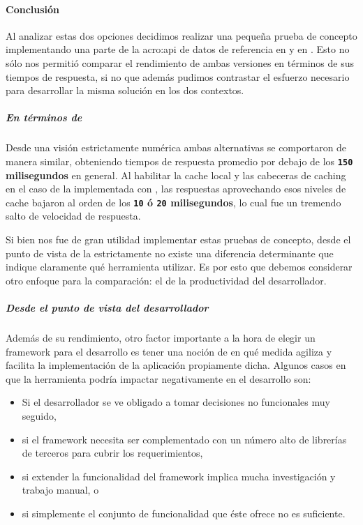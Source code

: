 \paragraph{Conclusión}

Al analizar estas dos opciones decidimos realizar una pequeña prueba de concepto implementando una parte de la \gls{acro:api} de datos de referencia en  y en . Esto no sólo nos permitió comparar el rendimiento de ambas versiones en términos de sus tiempos de respuesta, si no que además pudimos contrastar el esfuerzo necesario para desarrollar la misma solución en los dos contextos.

\subparagraph{En términos de }

Desde una visión estrictamente numérica ambas alternativas se comportaron de manera similar, obteniendo tiempos de respuesta promedio por debajo de los \textbf{\texttt{150} milisegundos} en general. Al habilitar la cache local y las cabeceras de caching en el caso de la implementada con , las respuestas aprovechando esos niveles de cache bajaron al orden de los \textbf{\texttt{10} ó \texttt{20} milisegundos}, lo cual fue un tremendo salto de velocidad de respuesta.

Si bien nos fue de gran utilidad implementar estas pruebas de concepto, desde el punto de vista de la  estrictamente no existe una diferencia determinante que indique claramente qué herramienta utilizar. Es por esto que debemos considerar otro enfoque para la comparación: el de la productividad del desarrollador.

\subparagraph{Desde el punto de vista del desarrollador}

Además de su rendimiento, otro factor importante a la hora de elegir un framework para el desarrollo es tener una noción de en qué medida agiliza y facilita la implementación de la aplicación propiamente dicha. Algunos casos en que la herramienta podría impactar negativamente en el desarrollo son:

\begin{itemize}
  \item Si el desarrollador se ve obligado a tomar decisiones no funcionales muy seguido,
  \item si el framework necesita ser complementado con un número alto de librerías de terceros para cubrir los requerimientos,
  \item si extender la funcionalidad del framework implica mucha investigación y trabajo manual, o
  \item si simplemente el conjunto de funcionalidad que éste ofrece no es suficiente.
\end{itemize}

